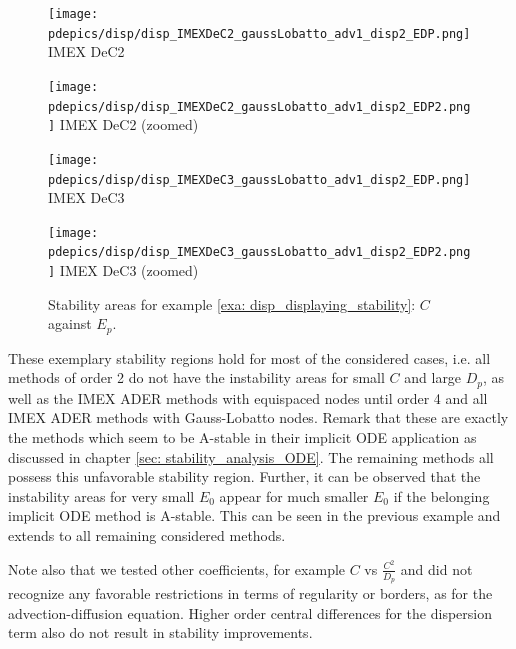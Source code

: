 \begin{example}
	\begin{figure}[!h]
		\centering
		\begin{minipage}[t]{0.24\textwidth}
			\centering
			\texttt{[image: pdepics/disp/disp\_IMEXDeC2\_gaussLobatto\_adv1\_disp2\_EDP.png]}
			IMEX DeC2
		\end{minipage} 
		\begin{minipage}[t]{0.24\textwidth}
			\centering
			\texttt{[image: pdepics/disp/disp\_IMEXDeC2\_gaussLobatto\_adv1\_disp2\_EDP2.png]}
			IMEX DeC2 (zoomed)
		\end{minipage}
		\begin{minipage}[t]{0.24\textwidth}
			\centering
			\texttt{[image: pdepics/disp/disp\_IMEXDeC3\_gaussLobatto\_adv1\_disp2\_EDP.png]}
			IMEX DeC3
		\end{minipage}
		\begin{minipage}[t]{0.24\textwidth}
			\centering
			\texttt{[image: pdepics/disp/disp\_IMEXDeC3\_gaussLobatto\_adv1\_disp2\_EDP2.png]}
			IMEX DeC3 (zoomed)
		\end{minipage}
		\caption{Stability areas for example \ref{exa: disp_displaying_stability}: $C$ against $E_p$.}
		\label{fig: disp_IIMEXDeC2/3_GLB_CvsE}
	\end{figure}
	
	These exemplary stability regions hold for most of the considered cases, i.e. all methods of order 2 do not have the instability areas for small $C$ and large $D_p$, as well as the IMEX ADER methods with equispaced nodes until order 4 and all IMEX ADER methods with Gauss-Lobatto nodes. Remark that these are exactly the methods which seem to be A-stable in their implicit ODE application as discussed in chapter \ref{sec: stability_analysis_ODE}. The remaining methods all possess this unfavorable stability region. Further, it can be observed that the instability areas for very small $E_0$ appear for much smaller $E_0$ if the belonging implicit ODE method is A-stable. This can be seen in the previous example and extends to all remaining considered methods. \\
\end{example}
Note also that we tested other coefficients, for example $C$ vs $\frac{C^2}{D_p}$ and did not recognize any favorable restrictions in terms of regularity or borders, as for the advection-diffusion equation. Higher order central differences for the dispersion term also do not result in stability improvements.\\
